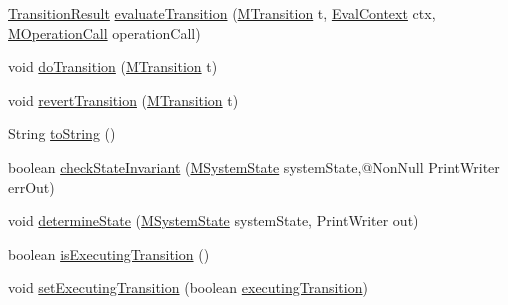 \begin{DoxyCompactItemize}
$$\item 
\hyperlink{classorg_1_1tzi_1_1use_1_1uml_1_1sys_1_1statemachines_1_1_m_protocol_state_machine_instance_1_1_transition_result}{Transition\-Result} \hyperlink{classorg_1_1tzi_1_1use_1_1uml_1_1sys_1_1statemachines_1_1_m_protocol_state_machine_instance_ab21a42dc75ca404a589a91390ae052b3}{evaluate\-Transition} (\hyperlink{classorg_1_1tzi_1_1use_1_1uml_1_1mm_1_1statemachines_1_1_m_transition}{M\-Transition} t, \hyperlink{classorg_1_1tzi_1_1use_1_1uml_1_1ocl_1_1expr_1_1_eval_context}{Eval\-Context} ctx, \hyperlink{classorg_1_1tzi_1_1use_1_1uml_1_1sys_1_1_m_operation_call}{M\-Operation\-Call} operation\-Call)
\item 
void \hyperlink{classorg_1_1tzi_1_1use_1_1uml_1_1sys_1_1statemachines_1_1_m_protocol_state_machine_instance_a6979c75b45bb9d385698106805e6d590}{do\-Transition} (\hyperlink{classorg_1_1tzi_1_1use_1_1uml_1_1mm_1_1statemachines_1_1_m_transition}{M\-Transition} t)
\item 
void \hyperlink{classorg_1_1tzi_1_1use_1_1uml_1_1sys_1_1statemachines_1_1_m_protocol_state_machine_instance_ac238c64a73534cf13f383ac7e36ff6cc}{revert\-Transition} (\hyperlink{classorg_1_1tzi_1_1use_1_1uml_1_1mm_1_1statemachines_1_1_m_transition}{M\-Transition} t)
\item 
String \hyperlink{classorg_1_1tzi_1_1use_1_1uml_1_1sys_1_1statemachines_1_1_m_protocol_state_machine_instance_abef71568d7eecd1f4938bedf793accfd}{to\-String} ()
\item 
boolean \hyperlink{classorg_1_1tzi_1_1use_1_1uml_1_1sys_1_1statemachines_1_1_m_protocol_state_machine_instance_a30e88160b9b6a84597297d440035c442}{check\-State\-Invariant} (\hyperlink{classorg_1_1tzi_1_1use_1_1uml_1_1sys_1_1_m_system_state}{M\-System\-State} system\-State,@Non\-Null Print\-Writer err\-Out)
\item 
void \hyperlink{classorg_1_1tzi_1_1use_1_1uml_1_1sys_1_1statemachines_1_1_m_protocol_state_machine_instance_ad87227640a7edc0a794b930c106dd745}{determine\-State} (\hyperlink{classorg_1_1tzi_1_1use_1_1uml_1_1sys_1_1_m_system_state}{M\-System\-State} system\-State, Print\-Writer out)
\item 
boolean \hyperlink{classorg_1_1tzi_1_1use_1_1uml_1_1sys_1_1statemachines_1_1_m_protocol_state_machine_instance_a089825cbef53b6b12144a9fee295f0a4}{is\-Executing\-Transition} ()
\item 
void \hyperlink{classorg_1_1tzi_1_1use_1_1uml_1_1sys_1_1statemachines_1_1_m_protocol_state_machine_instance_afffe2719f188203a42a033bd137bbeab}{set\-Executing\-Transition} (boolean \hyperlink{classorg_1_1tzi_1_1use_1_1uml_1_1sys_1_1statemachines_1_1_m_protocol_state_machine_instance_aca38770f89c09828112d7996118fc85c}{executing\-Transition})
\end{DoxyCompactItemize}
